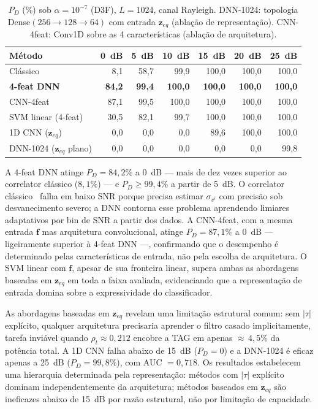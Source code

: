 \documentclass{sbrt}
\begin{document}
\begin{table}[htb]
\caption{\label{tab:resultados}$P_D$ (\%) sob $\alpha = 10^{-7}$ (D3F), $L=1024$, canal Rayleigh. DNN-1024: topologia Dense$(256\!\to\!128\!\to\!64)$ com entrada $\mathbf{z}_{eq}$ (ablação de representação). CNN-4feat: Conv1D sobre as 4 características (ablação de arquitetura).}
\begin{center}
\begin{tabular}{lrrrrrr}\toprule
Método & 0~dB & 5~dB & 10~dB & 15~dB & 20~dB & 25~dB \\\midrule
Clássico~\cite{ref_xie}          &  8{,}1 & 58{,}7 & 99{,}9 & 100{,}0 & 100{,}0 & 100{,}0 \\
\textbf{4-feat DNN}               & \textbf{84{,}2} & \textbf{99{,}4} & \textbf{100{,}0} & \textbf{100{,}0} & \textbf{100{,}0} & \textbf{100{,}0} \\
CNN-4feat                         & 87{,}1 & 99{,}5 & 100{,}0 & 100{,}0 & 100{,}0 & 100{,}0 \\
SVM linear (4-feat)               & 30{,}5 & 82{,}1 & 99{,}7 & 100{,}0 & 100{,}0 & 100{,}0 \\
1D CNN ($\mathbf{z}_{eq}$)~\cite{ref_liao} &  0{,}0 &  0{,}0 &  0{,}0 &  89{,}6 & 100{,}0 & 100{,}0 \\
DNN-1024 ($\mathbf{z}_{eq}$ plano) &  0{,}0 &  0{,}0 &  0{,}0 &   0{,}0 &   0{,}0 &  99{,}8 \\\bottomrule
\end{tabular}
\end{center}
\end{table}

A 4-feat DNN atinge $P_D = 84{,}2\%$ a 0~dB — mais de dez vezes superior ao correlator clássico ($8{,}1\%$) — e $P_D \geq 99{,}4\%$ a partir de 5~dB. O correlator clássico~\cite{ref_xie} falha em baixo SNR porque precisa estimar $\sigma_{v^i}$ com precisão sob desvanecimento severo; a DNN contorna esse problema aprendendo limiares adaptativos por bin de SNR a partir dos dados. A CNN-4feat, com a mesma entrada $\mathbf{f}$ mas arquitetura convolucional, atinge $P_D = 87{,}1\%$ a 0~dB — ligeiramente superior à 4-feat DNN —, confirmando que o desempenho é determinado pelas características de entrada, não pela escolha de arquitetura. O SVM linear com $\mathbf{f}$, apesar de sua fronteira linear, supera ambas as abordagens baseadas em $\mathbf{z}_{eq}$ em toda a faixa avaliada, evidenciando que a representação de entrada domina sobre a expressividade do classificador.

As abordagens baseadas em $\mathbf{z}_{eq}$ revelam uma limitação estrutural comum: sem $|\tau|$ explícito, qualquer arquitetura precisaria aprender o filtro casado implicitamente, tarefa inviável quando $\rho_t \approx 0{,}212$ encobre a TAG em apenas ${\approx}\,4{,}5\%$ da potência total. A 1D CNN falha abaixo de 15~dB ($P_D = 0$) e a DNN-1024 é eficaz apenas a 25~dB ($P_D = 99{,}8\%$), com AUC $= 0{,}718$. Os resultados estabelecem uma hierarquia determinada pela representação: métodos com $|\tau|$ explícito dominam independentemente da arquitetura; métodos baseados em $\mathbf{z}_{eq}$ são ineficazes abaixo de 15~dB por razão estrutural, não por limitação de capacidade.
\end{document}
